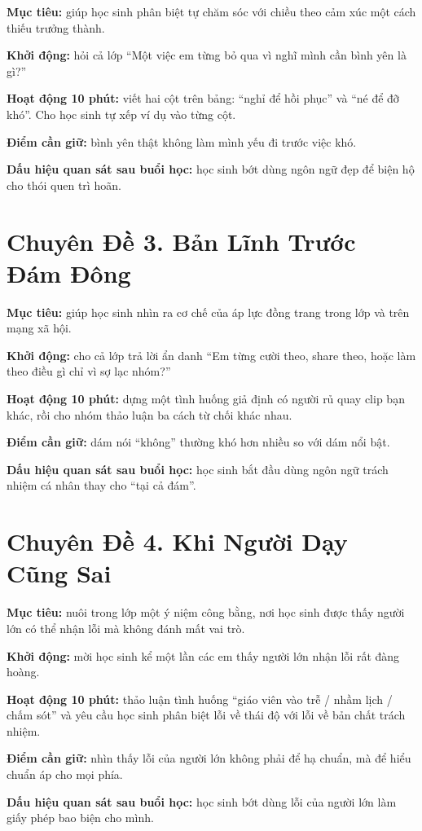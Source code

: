 \begin{goigiaovien}
\textbf{Mục tiêu:} giúp học sinh phân biệt tự chăm sóc với chiều theo cảm xúc một cách thiếu trưởng thành.

\textbf{Khởi động:} hỏi cả lớp ``Một việc em từng bỏ qua vì nghĩ mình cần bình yên là gì?''

\textbf{Hoạt động 10 phút:} viết hai cột trên bảng: ``nghỉ để hồi phục'' và ``né để đỡ khó''. Cho học sinh tự xếp ví dụ vào từng cột.

\textbf{Điểm cần giữ:} bình yên thật không làm mình yếu đi trước việc khó.

\textbf{Dấu hiệu quan sát sau buổi học:} học sinh bớt dùng ngôn ngữ đẹp để biện hộ cho thói quen trì hoãn.
\end{goigiaovien}

\section*{Chuyên Đề 3. Bản Lĩnh Trước Đám Đông}

\begin{goigiaovien}
\textbf{Mục tiêu:} giúp học sinh nhìn ra cơ chế của áp lực đồng trang trong lớp và trên mạng xã hội.

\textbf{Khởi động:} cho cả lớp trả lời ẩn danh ``Em từng cười theo, share theo, hoặc làm theo điều gì chỉ vì sợ lạc nhóm?''

\textbf{Hoạt động 10 phút:} dựng một tình huống giả định có người rủ quay clip bạn khác, rồi cho nhóm thảo luận ba cách từ chối khác nhau.

\textbf{Điểm cần giữ:} dám nói ``không'' thường khó hơn nhiều so với dám nổi bật.

\textbf{Dấu hiệu quan sát sau buổi học:} học sinh bắt đầu dùng ngôn ngữ trách nhiệm cá nhân thay cho ``tại cả đám''.
\end{goigiaovien}

\section*{Chuyên Đề 4. Khi Người Dạy Cũng Sai}

\begin{goigiaovien}
\textbf{Mục tiêu:} nuôi trong lớp một ý niệm công bằng, nơi học sinh được thấy người lớn có thể nhận lỗi mà không đánh mất vai trò.

\textbf{Khởi động:} mời học sinh kể một lần các em thấy người lớn nhận lỗi rất đàng hoàng.

\textbf{Hoạt động 10 phút:} thảo luận tình huống ``giáo viên vào trễ / nhầm lịch / chấm sót'' và yêu cầu học sinh phân biệt lỗi về thái độ với lỗi về bản chất trách nhiệm.

\textbf{Điểm cần giữ:} nhìn thấy lỗi của người lớn không phải để hạ chuẩn, mà để hiểu chuẩn áp cho mọi phía.

\textbf{Dấu hiệu quan sát sau buổi học:} học sinh bớt dùng lỗi của người lớn làm giấy phép bao biện cho mình.
\end{goigiaovien}


